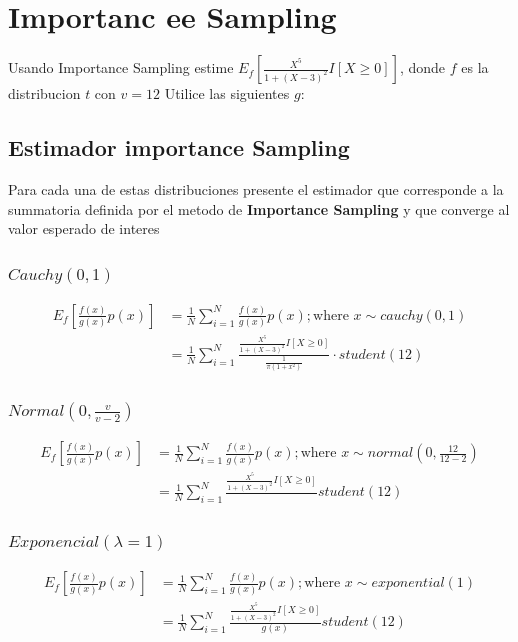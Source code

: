 \documentclass{article}
\begin{document}
\section{Importanc ee Sampling}

Usando Importance Sampling estime $E_f\left[ \frac{X^5}{1+(X - 3)^2}I[X \ge 0] \right]$, donde $f$ es la
distribucion $t$ con $v=12$ Utilice las siguientes $g$:

\subsection{Estimador importance Sampling}
Para cada una de estas distribuciones presente el estimador que corresponde a la summatoria definida
por el metodo de \textbf{Importance Sampling} y que converge al valor esperado de interes
\subsubsection{$Cauchy(0,1)$}
\[
	\begin{split}
		E_f\left[\frac{f(x)}{g(x)}p(x)\right] & = \frac{1}{N}\sum_{i=1}^{N}\frac{f(x)}{g(x)}p(x) ; \text{where } x \sim cauchy(0,1)                             \\
		                                      & = \frac{1}{N}\sum_{i=1}^{N}\frac{\frac{X^5}{1+(X - 3)^2}I[X \ge 0] }{\frac{1}{\pi (1 + x^2)}} \cdot student(12)
	\end{split}
\]
\subsubsection{$Normal(0, \frac{v}{v-2})$}
\[
	\begin{split}
		E_f\left[\frac{f(x)}{g(x)}p(x)\right] & = \frac{1}{N}\sum_{i=1}^{N}\frac{f(x)}{g(x)}p(x) ; \text{where } x \sim normal(0,\frac{12}{12-2}) \\
		                                      & = \frac{1}{N}\sum_{i=1}^{N}\frac{\frac{X^5}{1+(X - 3)^2}I[X \ge 0] }{}student(12)
	\end{split}
\]
\subsubsection{$Exponencial(\lambda=1)$}
\[
	\begin{split}
		E_f\left[\frac{f(x)}{g(x)}p(x)\right] & = \frac{1}{N}\sum_{i=1}^{N}\frac{f(x)}{g(x)}p(x) ; \text{where } x \sim exponential(1) \\
		                                      & = \frac{1}{N}\sum_{i=1}^{N}\frac{\frac{X^5}{1+(X - 3)^2}I[X \ge 0] }{g(x)}student(12)
	\end{split}
\]
\end{document}
